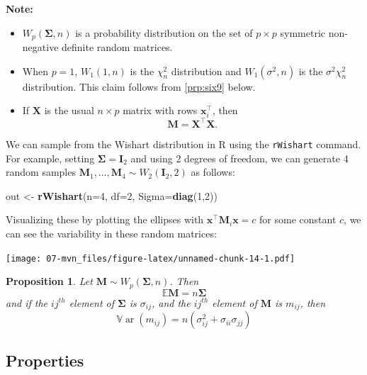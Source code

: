 \documentclass[]{book}
\newenvironment{Shaded}{\begin{snugshade}}{\end{snugshade}}
\newcommand{\DataTypeTok}[1]{\textcolor[rgb]{0.13,0.29,0.53}{#1}}
\newcommand{\DecValTok}[1]{\textcolor[rgb]{0.00,0.00,0.81}{#1}}
\newcommand{\KeywordTok}[1]{\textcolor[rgb]{0.13,0.29,0.53}{\textbf{#1}}}
\newcommand{\NormalTok}[1]{#1}
\newcommand{\StringTok}[1]{\textcolor[rgb]{0.31,0.60,0.02}{#1}}
\newtheorem{proposition}{Proposition}[chapter]
\theoremstyle{definition}
\theoremstyle{definition}
\theoremstyle{definition}
\theoremstyle{remark}
\begin{document}
\textbf{Note:}

\begin{itemize}
\item
  \(W_p(\boldsymbol \Sigma,n)\) is a probability distribution on the set of \(p \times p\) symmetric non-negative definite random matrices.
\item
  When \(p=1\), \(W_1(1,n)\) is the \(\chi_n^2\) distribution and \(W_1(\sigma^2,n)\) is the \(\sigma^2 \chi_n^2\) distribution. This claim follows from \ref{prp:six9} below.
\item
  If \(\boldsymbol X\) is the usual \(n \times p\) matrix with rows \(\boldsymbol x_i^\top\), then
  \[\boldsymbol M= \boldsymbol X^\top \boldsymbol X.\]
\end{itemize}

We can sample from the Wishart distribution in R using the \texttt{rWishart} command. For example, setting \(\boldsymbol \Sigma=\mathbf I_2\) and using 2 degrees of freedom, we can generate 4 random samples \(\boldsymbol M_1, \ldots, \boldsymbol M_4 \sim W_2(\mathbf I_2, 2)\) as follows:

\begin{Shaded}
\begin{Highlighting}[]
\NormalTok{out <-}\StringTok{ }\KeywordTok{rWishart}\NormalTok{(}\DataTypeTok{n=}\DecValTok{4}\NormalTok{, }\DataTypeTok{df=}\DecValTok{2}\NormalTok{, }\DataTypeTok{Sigma=}\KeywordTok{diag}\NormalTok{(}\DecValTok{1}\NormalTok{,}\DecValTok{2}\NormalTok{))}
\end{Highlighting}
\end{Shaded}

Visualizing these by plotting the ellipses with \(\boldsymbol x^\top \boldsymbol M_i \boldsymbol x=c\) for some constant \(c\), we can see the variability in these random matrices:

\texttt{[image: 07-mvn\_files/figure-latex/unnamed-chunk-14-1.pdf]}

\begin{proposition}
\protect\hypertarget{prp:wishartmean}{}{\label{prp:wishartmean} }Let \(\boldsymbol M\sim W_p(\boldsymbol \Sigma, n)\). Then
\[{\mathbb{E}}\boldsymbol M= n \boldsymbol \Sigma\]
and if the \(ij^{th}\) element of \(\boldsymbol \Sigma\) is \(\sigma_{ij}\), and the \(ij^{th}\) element of \(\boldsymbol M\) is \(m_{ij}\), then
\[{\mathbb{V}\operatorname{ar}}(m_{ij}) =  n \left(\sigma_{ij}^2+\sigma_{ii}\sigma_{jj} \right)\]
\end{proposition}

\hypertarget{properties-1}{%
\subsection{Properties}\label{properties-1}}
\end{document}
